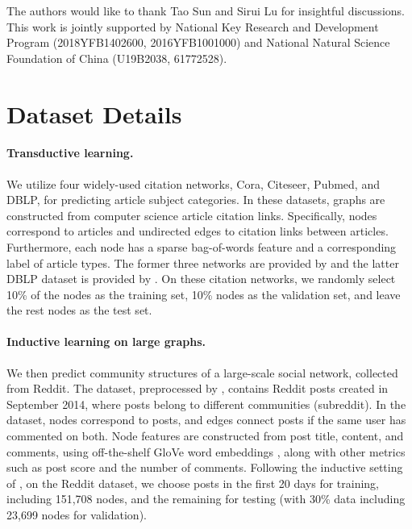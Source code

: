 \documentclass{article}
\theoremstyle{remark}
\begin{document}
The authors would like to thank Tao Sun and Sirui Lu for insightful discussions.
This work is jointly supported by National Key Research and Development Program (2018YFB1402600, 2016YFB1001000) and National Natural Science Foundation of China (U19B2038, 61772528).
 
\clearpage
\appendix
\section{Dataset Details}
\label{appendix:dataset}

\paragraph{Transductive learning.}
We utilize four widely-used citation networks, Cora, Citeseer, Pubmed, and DBLP, for predicting article subject categories.
In these datasets, graphs are constructed from computer science article citation links. Specifically, nodes correspond to articles and undirected edges to citation links between articles. Furthermore, each node has a sparse bag-of-words feature and a corresponding label of article types.
The former three networks are provided by \cite{Sen:2008gm,Yang:2016ts} and the latter DBLP dataset is provided by \cite{Bojchevski:2018ua}.
On these citation networks, we randomly select 10\% of the nodes as the training set, 10\% nodes as the validation set, and leave the rest nodes as the test set.

\paragraph{Inductive learning on large graphs.}
We then predict community structures of a large-scale social network, collected from Reddit. The dataset, preprocessed by \cite{Hamilton:2017tp}, contains Reddit posts created in September 2014, where posts belong to different communities (subreddit). In the dataset, nodes correspond to posts, and edges connect posts if the same user has commented on both.
Node features are constructed from post title, content, and comments, using off-the-shelf GloVe word embeddings \cite{Pennington:2014kh}, along with other metrics such as post score and the number of comments. 
Following the inductive setting of \cite{Hamilton:2017tp,Velickovic:2019tu}, on the Reddit dataset, we choose posts in the first 20 days for training, including 151,708 nodes, and the remaining for testing (with 30\% data including 23,699 nodes for validation).
\end{document}
